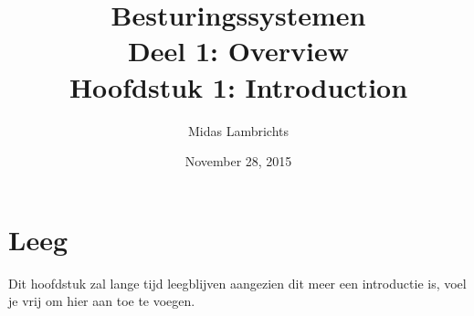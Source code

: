 \documentclass[12pt]{article}
\title{{\Huge Besturingssystemen} \\ {\LARGE Deel 1: Overview}\\{\Large Hoofdstuk 1: Introduction}}
\date{November 28, 2015}
\author{Midas Lambrichts}
\begin{document}
	\begin{titlepage}
		\maketitle
	\end{titlepage}

\section{Leeg}
Dit hoofdstuk zal lange tijd leegblijven aangezien dit meer een introductie is, voel je vrij om hier aan toe te voegen.
\end{document}
